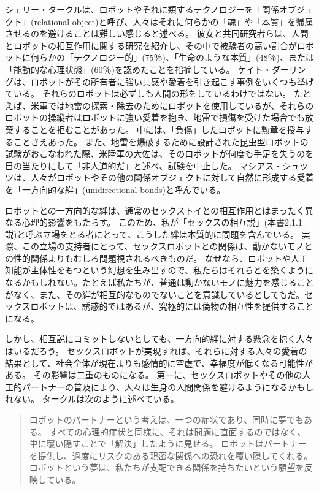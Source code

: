 \documentclass[paper=a4,book,openany]{jlreq}
\newcommand{\ig}[1]{}           %
\begin{document}
シェリー・タークルは、ロボットやそれに類するテクノロジーを「関係オブジェクト」(relational object)と呼び、人々はそれに何らかの「魂」や「本質」を帰属させるのを避けることは難しい感じると述べる。
彼女と共同研究者らは、人間とロボットの相互作用に関する研究を紹介し、その中で被験者の高い割合がロボットに何らかの「テクノロジー的」(75％)、「生命のような本質」(48％)、または「能動的な心理状態」(60％)を認めたことを指摘している\citep[p.349]{turkle18:_relat_artif_child_elder}。
ケイト・ダーリング\ig{Kate Darling}は、ロボットがその所有者に強い共感や愛着を引き起こす事例をいくつも挙げている。
それらのロボットは必ずしも人間の形をしているわけではない。
たとえば、米軍では地雷の探索・除去のためにロボットを使用しているが、それらのロボットの操縦者はロボットに強い愛着を抱き、地雷で損傷を受けた場合でも放棄することを拒むことがあった。
中には、「負傷」したロボットに勲章を授与することさえあった。
また、地雷を爆破するために設計された昆虫型ロボットの試験がおこなわれた際、米陸軍の大佐は、そのロボットが何度も手足を失うのを目の当たりにして「非人道的だ」と述べ、試験を中止した\citep{darling16:_exten_legal_protec_social_robot}。
マシアス・シュッツは、人々がロボットやその他の関係オブジェクトに対して自然に形成する愛着を「一方向的な絆」(unidirectional bonds)と呼んでいる\citep{scheutz12:_inher_danger_unidir_emotion_bonds}。

ロボットとの一方向的な絆は、通常のセックストイとの相互作用とはまったく異なる心理的影響をもたらす。
このため、私が「セックスの相互説」(本書2.1.1説)と呼ぶ立場をとる者にとって、こうした絆は本質的に問題を含んでいる。
実際、この立場の支持者にとって、セックスロボットとの関係は、動かないモノとの性的関係よりもむしろ問題視されるべきものだ。
なぜなら、ロボットや人工知能が主体性をもつという幻想を生み出すので、私たちはそれらとを築くようになるかもしれない。たとえば私たちが、普通は動かないモノに魅力を感じることがなく、また、その絆が相互的なものでないことを意識しているとしてもだ。セックスロボットは、誘惑的ではあるが、究極的には偽物の相互性を提供することになる。

しかし、相互説にコミットしないとしても、一方向的絆に対する懸念を抱く人々はいるだろう。
セックスロボットが実現すれば、それらに対する人々の愛着の結果として、社会全体が現在よりも感情的に空虚で、幸福度が低くなる可能性がある。
その影響は二重のものになる。
第一に、セックスロボットやその他の人工的パートナーの普及により、人々は生身の人間関係を避けるようになるかもしれない。
タークルは次のように述べている。

\begin{quote}
ロボットのパートナーという考えは、一つの症状であり、同時に夢でもある。
すべての心理的症状と同様に、それは問題に直面するのではなく、単に覆い隠すことで「解決」したように見せる。
ロボットはパートナーを提供し、過度にリスクのある親密な関係への恐れを覆い隠してくれる。
ロボットという夢は、私たちが支配できる関係を持ちたいという願望を反映している。
\citep[p.285]{turkle11:_alone_toget}
\end{quote}
\end{document}
